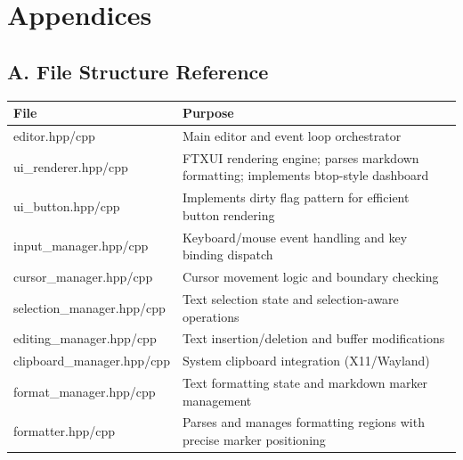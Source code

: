 \documentclass[12pt,a4paper,oneside,openany]{report}
\begin{document}
\chapter*{Appendices}

\section*{A. File Structure Reference}

\begin{table}[H]
	\centering
	\begin{tabular}{|l|p{8cm}|}
		\hline
		\textbf{File}               & \textbf{Purpose}                                                                    \\
		\hline
		editor.hpp/cpp              & Main editor and event loop orchestrator                                             \\
		\hline
		ui\_renderer.hpp/cpp        & FTXUI rendering engine; parses markdown formatting; implements btop-style dashboard \\
		\hline
		ui\_button.hpp/cpp          & Implements dirty flag pattern for efficient button rendering                        \\
		\hline
		input\_manager.hpp/cpp      & Keyboard/mouse event handling and key binding dispatch                              \\
		\hline
		cursor\_manager.hpp/cpp     & Cursor movement logic and boundary checking                                         \\
		\hline
		selection\_manager.hpp/cpp  & Text selection state and selection-aware operations                                 \\
		\hline
		editing\_manager.hpp/cpp    & Text insertion/deletion and buffer modifications                                    \\
		\hline
		clipboard\_manager.hpp/cpp  & System clipboard integration (X11/Wayland)                                          \\
		\hline
		format\_manager.hpp/cpp     & Text formatting state and markdown marker management                                \\
		\hline
		formatter.hpp/cpp           & Parses and manages formatting regions with precise marker positioning               \\

\end{tabular}
\end{table}
\end{document}
